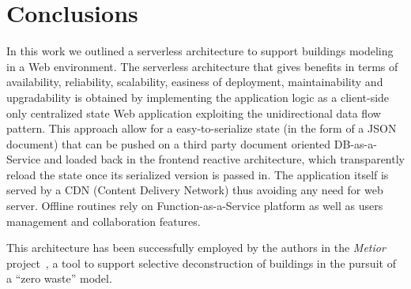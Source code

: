 \section{Conclusions}\label{sec:conclusions}

In this work we outlined a serverless architecture to support buildings modeling in a Web environment. The serverless  architecture that gives benefits in terms of availability, reliability, scalability, easiness of deployment, maintainability and upgradability is obtained by implementing the application logic as a client-side only centralized state Web application exploiting the unidirectional data flow pattern. This approach allow for a easy-to-serialize state (in the form of a JSON document) that can be pushed on a third party document oriented DB-as-a-Service and loaded back in the frontend reactive architecture, which transparently reload the state once its serialized version is passed in. The application itself is served by a CDN (Content Delivery Network) thus avoiding any need for web server. Offline routines rely on Function-as-a-Service platform as well as users management and collaboration features.

This architecture has been successfully employed by the authors in the \emph{Metior} project~\cite{grapp17}, a tool to support selective deconstruction of buildings in the pursuit of a ``zero waste'' model.
